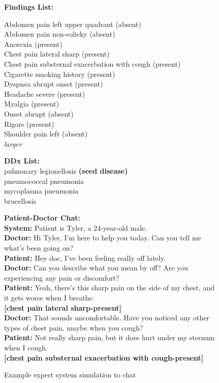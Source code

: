 \begin{figure*}
\begin{tcolorbox}[boxsep=2pt,left=2pt,right=2pt,top=2pt,bottom=2pt,colback=White,]
\begin{multicols}{2}

\textbf{Findings List:}

Abdomen pain left upper quadrant (absent)\\
Abdomen pain non-colicky (absent)\\
Anorexia (present)\\
Chest pain lateral sharp (present)\\
Chest pain substernal exacerbation with cough (present)\\
Cigarette smoking history (present)\\
Dyspnea abrupt onset (present)\\
Headache severe (present)\\
Myalgia (present)\\
Onset abrupt (absent)\\
Rigors (present)\\
Shoulder pain left (absent)\\
\textit{larger }



\textbf{DDx List:}\\
pulmonary legionellosis \textbf{(seed disease)}\\
pneumococcal pneumonia\\
mycoplasma pneumonia\\
brucellosis

\columnbreak
\textbf{Patient-Doctor Chat:}\\
\textbf{System:} Patient is Tyler, a 24-year-old male.\\
\textbf{Doctor:} Hi Tyler, I'm here to help you today. Can you tell me what's been going on?\\
\textbf{Patient:} Hey doc, I've been feeling really off lately.\\
\textbf{Doctor:} Can you describe what you mean by off? Are you experiencing any pain or discomfort?\\
\textbf{Patient:} Yeah, there's this sharp pain on the side of my chest, and it gets worse when I breathe.\\
\textbf{[chest pain lateral sharp-present]}\\
\textbf{Doctor:} That sounds uncomfortable. Have you noticed any other types of chest pain, maybe when you cough?\\
\textbf{Patient:} Not really sharp pain, but it does hurt under my sternum when I cough.\\
\textbf{[chest pain substernal exacerbation with cough-present]}



\end{multicols}
\end{tcolorbox}
\caption{Example expert system simulation to chat}
\label{fig:chat_simulation_ex_app}
\end{figure*}